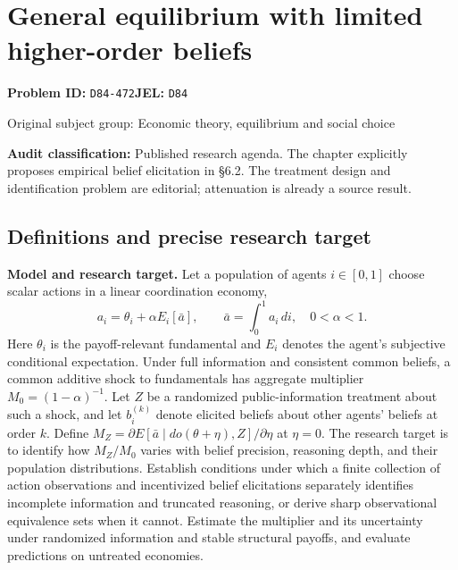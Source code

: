 \documentclass[11pt,a4paper]{article}
\begin{document}
\section*{General equilibrium with limited higher-order beliefs}
\textbf{Problem ID:} \texttt{D84-472}\quad \textbf{JEL:} \texttt{D84}\par
\label{problem:OP-0272}
{\sffamily\small\color{muted}Original subject group: Economic theory, equilibrium and social choice\par}
\label{definitions:problem:30007553}
\textbf{Audit classification:} Published research agenda. The chapter explicitly proposes empirical belief elicitation in §6.2. The treatment design and identification problem are editorial; attenuation is already a source result.
\subsection*{Definitions and precise research target}
\textbf{Model and research target.} Let a population of agents \(i\in[0,1]\) choose scalar actions in a linear coordination economy,
\[
 a_i=\theta_i+\alpha E_i[\bar a],\qquad \bar a=\int_0^1a_i\,di,\quad0<\alpha<1.
\]
Here \(\theta_i\) is the payoff-relevant fundamental and \(E_i\) denotes the agent's subjective conditional expectation. Under full information and consistent common beliefs, a common additive shock to fundamentals has aggregate multiplier \(M_0=(1-\alpha)^{-1}\). Let \(Z\) be a randomized public-information treatment about such a shock, and let \(b_i^{(k)}\) denote elicited beliefs about other agents' beliefs at order \(k\). Define \(M_Z=\partial E[\bar a\mid do(\theta+\eta),Z]/\partial\eta\) at \(\eta=0\). The research target is to identify how \(M_Z/M_0\) varies with belief precision, reasoning depth, and their population distributions. Establish conditions under which a finite collection of action observations and incentivized belief elicitations separately identifies incomplete information and truncated reasoning, or derive sharp observational equivalence sets when it cannot. Estimate the multiplier and its uncertainty under randomized information and stable structural payoffs, and evaluate predictions on untreated economies.
\end{document}

